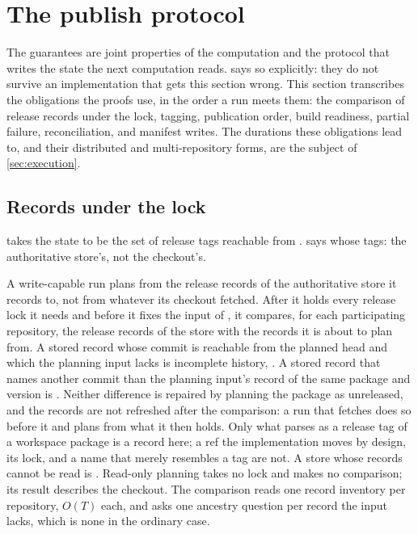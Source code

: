 \section{The publish protocol}
\label{sec:protocol}

The guarantees are joint properties of the computation and the protocol that
writes the state the next computation reads.  says so explicitly: they
do not survive an implementation that gets this section wrong. This section
transcribes the obligations the proofs use, in the order a run meets them: the
comparison of release records under the lock, tagging, publication order, build
readiness, partial failure, reconciliation, and manifest writes. The durations
these obligations lead to, and their distributed and multi-repository forms,
are the subject of \cref{sec:execution}.

\subsection{Records under the lock}

 takes the state \st{} to be the set of release tags reachable
from \Head{}.  says whose tags: the authoritative store's, not the
checkout's.

\begin{definition}
\label{def:records-lock}
A write-capable run plans from the release records of the authoritative store
it records to, not from whatever its checkout fetched. After it holds every
release lock it needs and before it fixes the input of , it
compares, for each participating repository, the release records of the store
with the records it is about to plan from. A stored record whose commit is
reachable from the planned head and which the planning input lacks is
incomplete history, . A stored record that names another commit
than the planning input's record of the same package and version is
. Neither difference is repaired by planning the package as
unreleased, and the records are not refreshed after the comparison: a run that
fetches does so before it and plans from what it then holds. Only what
 parses as a release tag of a workspace package is a record here; a
ref the implementation moves by design, its lock, and a name that merely
resembles a tag are not. A store whose records cannot be read is .
Read-only planning takes no lock and makes no comparison; its result describes
the checkout. The comparison reads one record inventory per repository, $O(T)$
each, and asks one ancestry question per record the input lacks, which is none
in the ordinary case.
\end{definition}

